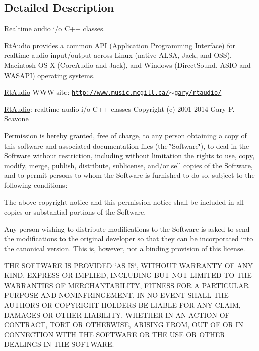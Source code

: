 \subsection{Detailed Description}
Realtime audio i/o C++ classes. 

\hyperlink{class_rt_audio}{Rt\+Audio} provides a common A\+PI (Application Programming Interface) for realtime audio input/output across Linux (native A\+L\+SA, Jack, and O\+SS), Macintosh OS X (Core\+Audio and Jack), and Windows (Direct\+Sound, A\+S\+IO and W\+A\+S\+A\+PI) operating systems.

\hyperlink{class_rt_audio}{Rt\+Audio} W\+WW site\+: \href{http://www.music.mcgill.ca/~gary/rtaudio/}{\tt http\+://www.\+music.\+mcgill.\+ca/$\sim$gary/rtaudio/}

\hyperlink{class_rt_audio}{Rt\+Audio}\+: realtime audio i/o C++ classes Copyright (c) 2001-\/2014 Gary P. Scavone

Permission is hereby granted, free of charge, to any person obtaining a copy of this software and associated documentation files (the \char`\"{}\+Software\char`\"{}), to deal in the Software without restriction, including without limitation the rights to use, copy, modify, merge, publish, distribute, sublicense, and/or sell copies of the Software, and to permit persons to whom the Software is furnished to do so, subject to the following conditions\+:

The above copyright notice and this permission notice shall be included in all copies or substantial portions of the Software.

Any person wishing to distribute modifications to the Software is asked to send the modifications to the original developer so that they can be incorporated into the canonical version. This is, however, not a binding provision of this license.

T\+HE S\+O\+F\+T\+W\+A\+RE IS P\+R\+O\+V\+I\+D\+ED \char`\"{}\+A\+S I\+S\char`\"{}, W\+I\+T\+H\+O\+UT W\+A\+R\+R\+A\+N\+TY OF A\+NY K\+I\+ND, E\+X\+P\+R\+E\+SS OR I\+M\+P\+L\+I\+ED, I\+N\+C\+L\+U\+D\+I\+NG B\+UT N\+OT L\+I\+M\+I\+T\+ED TO T\+HE W\+A\+R\+R\+A\+N\+T\+I\+ES OF M\+E\+R\+C\+H\+A\+N\+T\+A\+B\+I\+L\+I\+TY, F\+I\+T\+N\+E\+SS F\+OR A P\+A\+R\+T\+I\+C\+U\+L\+AR P\+U\+R\+P\+O\+SE A\+ND N\+O\+N\+I\+N\+F\+R\+I\+N\+G\+E\+M\+E\+NT. IN NO E\+V\+E\+NT S\+H\+A\+LL T\+HE A\+U\+T\+H\+O\+RS OR C\+O\+P\+Y\+R\+I\+G\+HT H\+O\+L\+D\+E\+RS BE L\+I\+A\+B\+LE F\+OR A\+NY C\+L\+A\+IM, D\+A\+M\+A\+G\+ES OR O\+T\+H\+ER L\+I\+A\+B\+I\+L\+I\+TY, W\+H\+E\+T\+H\+ER IN AN A\+C\+T\+I\+ON OF C\+O\+N\+T\+R\+A\+CT, T\+O\+RT OR O\+T\+H\+E\+R\+W\+I\+SE, A\+R\+I\+S\+I\+NG F\+R\+OM, O\+UT OF OR IN C\+O\+N\+N\+E\+C\+T\+I\+ON W\+I\+TH T\+HE S\+O\+F\+T\+W\+A\+RE OR T\+HE U\+SE OR O\+T\+H\+ER D\+E\+A\+L\+I\+N\+GS IN T\+HE S\+O\+F\+T\+W\+A\+RE. 

